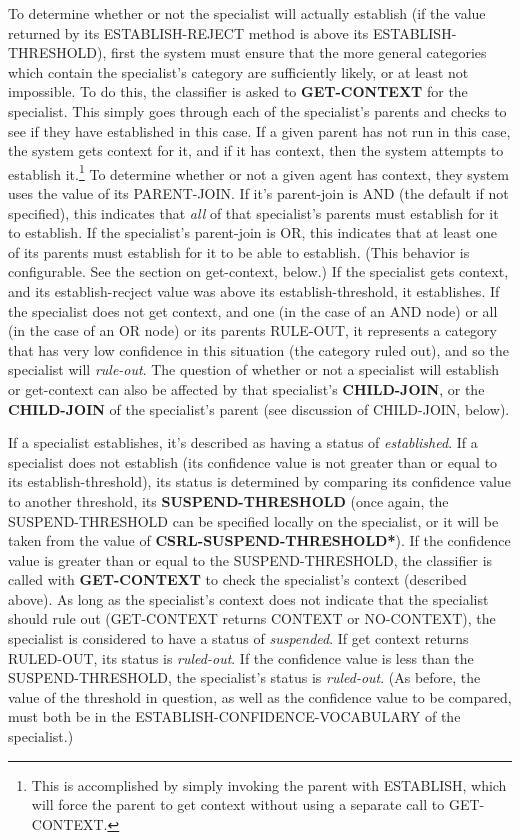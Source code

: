 To determine whether or not the specialist will actually establish (if
the value returned by its ESTABLISH-REJECT method is above its
ESTABLISH-THRESHOLD), first the system must ensure that the more
general categories which contain the specialist's category are
sufficiently likely, or at least not impossible. To do this, the
classifier is asked to {\bf GET-CONTEXT} for the specialist. This
simply goes through each of the specialist's parents and checks to see
if they have established in this case. If a given parent has not run
in this case, the system gets context for it, and if it has context,
then the system attempts to establish it.\footnote{This is
accomplished by simply invoking the parent with ESTABLISH, which will
force the parent to get context without using a separate call to
GET-CONTEXT.} To determine whether or not a given agent has context,
they system uses the value of its PARENT-JOIN. If it's parent-join is
AND (the default if not specified), this indicates that {\it all} of
that specialist's parents must establish for it to establish. If the
specialist's parent-join is OR, this indicates that at least one of
its parents must establish for it to be able to establish. (This
behavior is configurable. See the section on get-context, below.) If
the specialist gets context, and its establish-recject value was above
its establish-threshold, it establishes. If the specialist does not
get context, and one (in the case of an AND node) or all (in the case
of an OR node) or its parents RULE-OUT, it represents a category that
has very low confidence in this situation (the category ruled out),
and so the specialist will {\it rule-out}. The question of whether or
not a specialist will establish or get-context can also be affected by
that specialist's {\bf CHILD-JOIN}, or the {\bf CHILD-JOIN} of the
specialist's parent (see discussion of CHILD-JOIN, below).

If a specialist establishes, it's described as having a status of {\it
established\/}. If a specialist does not establish (its confidence
value is not greater than or equal to its establish-threshold), its
status is determined by comparing its confidence value to another
threshold, its {\bf SUSPEND-THRESHOLD} (once again, the
SUSPEND-THRESHOLD can be specified locally on the specialist, or it
will be taken from the value of {\bf *CSRL-SUSPEND-THRESHOLD*}). If
the confidence value is greater than or equal to the
SUSPEND-THRESHOLD, the classifier is called with {\bf GET-CONTEXT} to
check the specialist's context (described above). As long as the
specialist's context does not indicate that the specialist should rule
out (GET-CONTEXT returns CONTEXT or NO-CONTEXT), the specialist is
considered to have a status of {\it suspended\/}. If get context
returns RULED-OUT, its status is {\it ruled-out\/}. If the confidence
value is less than the SUSPEND-THRESHOLD, the specialist's status is
{\it ruled-out}. (As before, the value of the threshold in question,
as well as the confidence value to be compared, must both be in the
ESTABLISH-CONFIDENCE-VOCABULARY of the specialist.)

